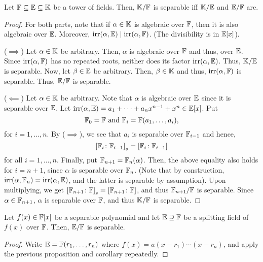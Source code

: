 \begin{prop}
    Let $\mathbb{F} \subseteq \mathbb{E} \subseteq \mathbb{K}$ be a tower of fields. Then, $\mathbb{K}/\mathbb{F}$ is separable iff $\mathbb{K}/\mathbb{E}$ and $\mathbb{E}/\mathbb{F}$ are.
\end{prop}
\begin{proof}
    For both parts, note that if $\alpha \in \mathbb{K}$ is algebraic over $\mathbb{F}$, then it is also algebraic over $\mathbb{E}$. Moreover, $\operatorname{irr}(\alpha, \mathbb{E}) \mid \operatorname{irr}(\alpha, \mathbb{F})$. (The divisibility is in $\mathbb{E}[x]$). 
    
    ($\implies$) Let $\alpha \in \mathbb{K}$ be arbitrary. Then, $\alpha$ is algebraic over $\mathbb{F}$ and thus, over $\mathbb{E}$. Since $\operatorname{irr}(\alpha, \mathbb{F})$ has no repeated roots, neither does its factor $\operatorname{irr}(\alpha, \mathbb{E})$. 
    Thus, $\mathbb{K}/\mathbb{E}$ is separable. Now, let $\beta \in \mathbb{E}$ be arbitrary. Then, $\beta \in \mathbb{K}$ and thus, $\operatorname{irr}(\alpha, \mathbb{F})$ is separable. Thus, $\mathbb{E}/\mathbb{F}$ is separable. 
    
    ($\impliedby$) Let $\alpha \in \mathbb{K}$ be arbitrary. Note that $\alpha$ is algebraic over $\mathbb{E}$ since it is separable over $\mathbb{E}$. Let $\operatorname{irr}(\alpha, \mathbb{E}) = a_1 + \cdots + a_nx^{n-1} + x^n \in \mathbb{E}[x]$. Put
    \[
        \mathbb{F}_0 = \mathbb{F} \text{  and  } \mathbb{F}_i = \mathbb{F}(a_1,\ldots, a_i),
    \]
    for $i=1,\ldots,n$. By ($\implies$), we see that $a_i$ is separable over $\mathbb{F}_{i-1}$ and hence,
    \[
        \left[ \mathbb{F}_i \colon \mathbb{F}_{i-1} \right]_s = \left[ \mathbb{F}_i \colon \mathbb{F}_{i-1} \right]
    \]
    for all $i=1,\ldots,n$. Finally, put $\mathbb{F}_{n+1} = \mathbb{F}_n(\alpha)$. Then, the above equality also holds for $i=n+1$, since $\alpha$ is separable over $\mathbb{F}_n$. (Note that by construction, $\operatorname{irr}(\alpha, \mathbb{F}_n) = \operatorname{irr}(\alpha, \mathbb{E})$, and the latter is separable by assumption). Upon multiplying, we get $\left[ \mathbb{F}_{n+1} \colon \mathbb{F} \right]_s = \left[ \mathbb{F}_{n+1} \colon \mathbb{F}\right]$, and thus $\mathbb{F}_{n+1}/\mathbb{F}$ is separable. Since $\alpha \in \mathbb{F}_{n+1}$, $\alpha$ is separable over $\mathbb{F}$, and thus $\mathbb{K}/\mathbb{F}$ is separable.
\end{proof}

\begin{cor}
    Let $f(x) \in \mathbb{F}[x]$ be a separable polynomial and let $\mathbb{E} \supseteq \mathbb{F}$ be a splitting field of $f(x)$ over $\mathbb{F}$. Then, $\mathbb{E}/\mathbb{F}$ is separable. 
\end{cor}
\begin{proof}
    Write $\mathbb{E} = \mathbb{F}(r_1,\ldots,r_n)$ where $f(x) = a(x-r_1)\cdots(x-r_n)$, and apply the previous proposition and corollary repeatedly.
\end{proof}

